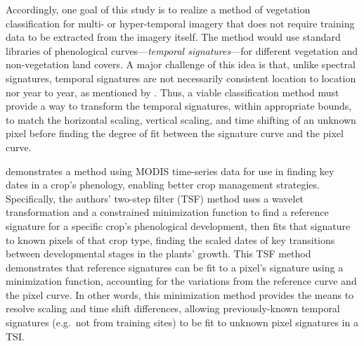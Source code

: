 Accordingly, one goal of this study is to realize a method of vegetation classification for multi- or hyper-temporal imagery that does not require training data to be extracted from the imagery itself. The method would use standard libraries of phenological curves---\textit{temporal signatures}---for different vegetation and non-vegetation land covers. A major challenge of this idea is that, unlike spectral signatures, temporal signatures are not necessarily consistent location to location nor year to year, as mentioned by \citeauthor{masialeti2010a-comparative}. Thus, a viable classification method must provide a way to transform the temporal signatures, within appropriate bounds, to match the horizontal scaling, vertical scaling, and time shifting of an unknown pixel before finding the degree of fit between the signature curve and the pixel curve.

\textcites{sakamoto2005a-crop}{sakamoto2010a-two-step} demonstrates a method using MODIS time-series data for use in finding key dates in a crop’s phenology, enabling better crop management strategies. Specifically, the authors’ two-step filter (TSF) method uses a wavelet transformation and a constrained minimization function to find a reference signature for a specific crop’s phenological development, then fits that signature to known pixels of that crop type, finding the scaled dates of key transitions between developmental stages in the plants’ growth. This TSF method demonstrates that reference signatures can be fit to a pixel’s signature using a minimization function, accounting for the variations from the reference curve and the pixel curve. In other words, this minimization method provides the means to resolve scaling and time shift differences, allowing previously-known temporal signatures (e.g.\ not from training sites) to be fit to unknown pixel signatures in a TSI.

